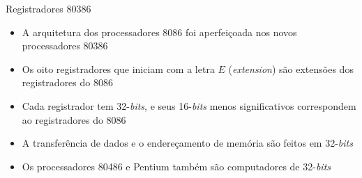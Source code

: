 \begin{frame}[fragile]{Registradores 80386}

    \begin{itemize}
        \item A arquitetura dos processadores 8086 foi aperfeiçoada nos novos processadores 80386

        \item Os oito registradores que iniciam com a letra $E$ (\textit{extension}) são extensões
            dos registradores do 8086

        \item Cada registrador tem 32-\textit{bits}, e seus 16-\textit{bits} menos significativos
            correspondem ao registradores do 8086

        \item A transferência de dados e o endereçamento de memória são feitos em 32-\textit{bits}

        \item Os processadores 80486 e Pentium também são computadores de 32-\textit{bits}
    \end{itemize}

\end{frame}

